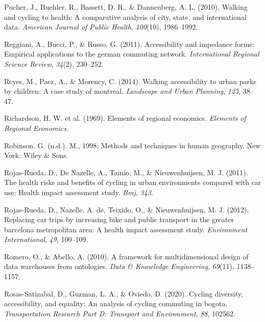 \documentclass[
11pt, %
oneside, %
english, %
singlespacing, %
]{macthesis} %
\newlength{\cslhangindent}
\newenvironment{CSLReferences}[2] %
 {%
  \setlength{\parindent}{0pt}
  \ifodd #1 \everypar{\setlength{\hangindent}{\cslhangindent}}\ignorespaces\fi
  \ifnum #2 > 0
  \setlength{\parskip}{#2\baselineskip}
  \fi
 }%
 {}
\begin{document}
\begin{CSLReferences}{1}{0}
\leavevmode{}%
Pucher, J., Buehler, R., Bassett, D. R., \& Dannenberg, A. L. (2010). Walking and cycling to health: A comparative analysis of city, state, and international data. \emph{American Journal of Public Health}, \emph{100}(10), 1986--1992.

\leavevmode{}%
Reggiani, A., Bucci, P., \& Russo, G. (2011). Accessibility and impedance forms: Empirical applications to the german commuting network. \emph{International Regional Science Review}, \emph{34}(2), 230--252.

\leavevmode{}%
Reyes, M., Paez, A., \& Morency, C. (2014). Walking accessibility to urban parks by children: A case study of montreal. \emph{Landscape and Urban Planning}, \emph{125}, 38--47.

\leavevmode{}%
Richardson, H. W. et al. (1969). Elements of regional economics. \emph{Elements of Regional Economics.}

\leavevmode{}%
Robinson, G. (n.d.). M., 1998: Methods and techniques in human geography. New York: Wiley \& Sons.

\leavevmode{}%
Rojas-Rueda, D., De Nazelle, A., Tainio, M., \& Nieuwenhuijsen, M. J. (2011). The health risks and benefits of cycling in urban environments compared with car use: Health impact assessment study. \emph{Bmj}, \emph{343}.

\leavevmode{}%
Rojas-Rueda, D., Nazelle, A. de, Teixido, O., \& Nieuwenhuijsen, M. J. (2012). Replacing car trips by increasing bike and public transport in the greater barcelona metropolitan area: A health impact assessment study. \emph{Environment International}, \emph{49}, 100--109.

\leavevmode{}%
Romero, O., \& Abello, A. (2010). A framework for multidimensional design of data warehouses from ontologies. \emph{Data \& Knowledge Engineering}, \emph{69}(11), 1138--1157.

\leavevmode{}%
Rosas-Satizabal, D., Guzman, L. A., \& Oviedo, D. (2020). Cycling diversity, accessibility, and equality: An analysis of cycling commuting in bogota. \emph{Transportation Research Part D: Transport and Environment}, \emph{88}, 102562.


\end{CSLReferences}
\end{document}
